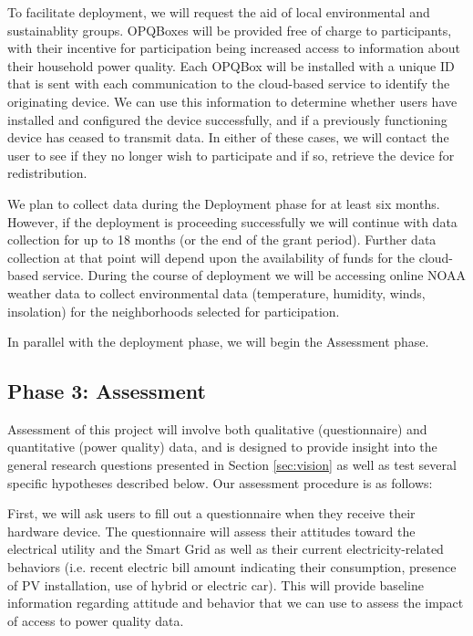 To facilitate deployment, we will request the aid of local environmental and sustainablity groups.  OPQBoxes will be provided free of charge to participants, with their incentive for participation being increased access to information about their household power quality.   Each OPQBox will be installed with a unique ID that is sent with each communication to the cloud-based service to identify the originating device.  We can use this information to determine whether users have installed and configured the device successfully, and if a previously functioning device has ceased to transmit data.   In either of these cases, we will contact the user to see if they no longer wish to participate and if so, retrieve the device for redistribution. 

We plan to collect data during the Deployment phase for at least six months. However, if the deployment is proceeding successfully we will continue with data collection for up to 18 months (or the end of the grant period).  Further data collection at that point will depend upon the availability of funds for the cloud-based service.
During the course of deployment we will be accessing online NOAA weather data to collect environmental data (temperature, humidity, winds, insolation) for the neighborhoods selected for participation. 

In parallel with the deployment phase, we will begin the Assessment phase. 

\subsection{Phase 3: Assessment}

Assessment of this project will involve both qualitative (questionnaire) and quantitative (power quality) data, and is designed to provide insight into the general research questions presented in Section \ref{sec:vision} as well as test several specific hypotheses described below. Our assessment procedure is as follows:

First, we will ask users to fill out a questionnaire when they receive their hardware device.  The questionnaire will assess their attitudes toward the electrical utility and the Smart Grid as well as their current electricity-related behaviors (i.e. recent electric bill amount indicating their consumption, presence of PV installation, use of hybrid or electric car). This will provide baseline information regarding attitude and behavior that we can use to assess the impact of access to power quality data.

